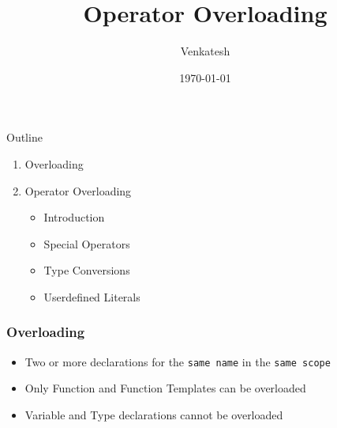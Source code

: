 \documentclass{beamer}
\title{Operator Overloading} %
\author{Venkatesh} %
\institute{WDC}
\date{\today} %
\begin{document}
\lstset{
    basicstyle=\ttfamily\footnotesize,
    breaklines=true
    breakatwhitespace=true,
    language=C++,
    columns=fullflexible,
    keepspaces=true,
    breaklines=true,
    tabsize=3, 
    showstringspaces=false,
    extendedchars=true
    inputencoding=utf8
}

\begin{frame}
\titlepage %
\end{frame}

\begin{frame}{Outline}
  \begin{enumerate}
   \item Overloading
   \item Operator Overloading
        \begin{itemize}
        \item Introduction
        \item Special Operators
        \item Type Conversions
        \item Userdefined Literals
        \end{itemize}
  \end{enumerate}
\end{frame}




\begin{frame}[fragile]
\frametitle{Overloading}

\begin{itemize}
\item Two or more declarations for the \texttt{same name} in the \texttt{same scope}
\item Only Function and Function Templates can be overloaded
\item Variable and Type declarations cannot be overloaded
\end{itemize}

\end{frame}
\end{document}
